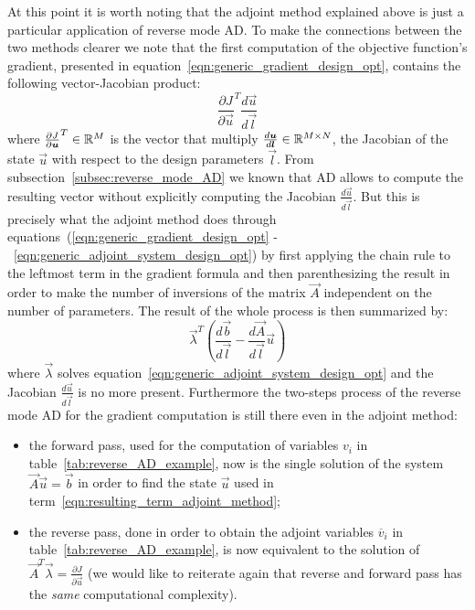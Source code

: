 \bigskip
At this point it is worth noting that the adjoint method explained above is just a particular application of reverse mode AD. To make the connections between the two methods clearer we note that the first computation of the  objective function's gradient, presented in equation~\eqref{eqn:generic_gradient_design_opt}, contains the following vector-Jacobian product:
\begin{equation}
	\label{eqn:vJp_design_opt}
	\frac{\partial J}{\partial \vec{u}}^T \frac{d\vec{u}}{d\vec{l}}
\end{equation}
where $\frac{\partial J}{\partial \boldsymbol{u}}^T \in \mathbb{R}^M$ is the vector that multiply $\frac{d\boldsymbol{u}}{d\boldsymbol{l}} \in \mathbb{R}^{M \times N}$, the Jacobian of the state $\vec{u}$ with respect to the design parameters $\vec{l}$.
From subsection~\vref{subsec:reverse_mode_AD} we known that AD allows to compute the resulting vector without explicitly computing the Jacobian $\frac{d\vec{u}}{d\vec{l}}$. But this is precisely what the adjoint method does through equations~(\ref{eqn:generic_gradient_design_opt} -~\ref{eqn:generic_adjoint_system_design_opt}) by first applying the chain rule to the leftmost term in the gradient formula and then parenthesizing the result in order to make the number of inversions of the matrix $\vec{A}$ independent on the number of parameters.
The result of the whole process is then summarized by:
\begin{equation}
	\label{eqn:resulting_term_adjoint_method}
	\vec{\lambda}^T \left( \frac{d\vec{b}}{d\vec{l}} - \frac{d\vec{A}}{d\vec{l}}\vec{u} \right)
\end{equation}
where $\vec{\lambda}$ solves equation~\eqref{eqn:generic_adjoint_system_design_opt} and the Jacobian $\frac{d\vec{u}}{d\vec{l}}$ is no more present. Furthermore the two-steps process of the reverse mode AD for the gradient computation is still there even in the adjoint method:
\begin{itemize}
	\item the forward pass, used for the computation of variables $v_i$ in table~\ref{tab:reverse_AD_example}, now is the single solution of the system $\vec{A}\vec{u}=\vec{b}$ in order to find the state $\vec{u}$ used in term~\eqref{eqn:resulting_term_adjoint_method};
	\item the reverse pass, done in order to obtain the adjoint variables $\overline{v}_i$ in table~\ref{tab:reverse_AD_example}, is now equivalent to the solution of $\vec{A}^T \vec{\lambda} = \frac{\partial J}{\partial \vec{u}}$ (we would like to reiterate again that reverse and forward pass has the \emph{same} computational complexity). 
\end{itemize}


